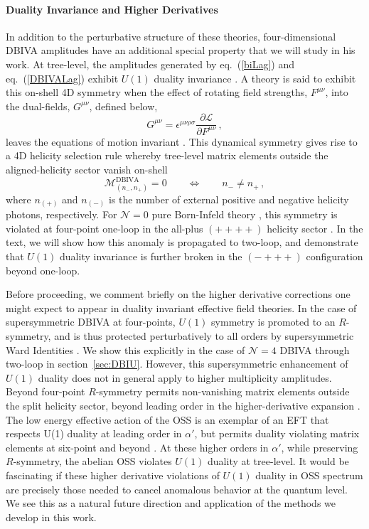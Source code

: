 \documentclass[11pt,letter]{article}
\def\sect#1{section~\ref{#1}}
\def\eqn#1{eq.~(\ref{#1})}
\begin{document}
\paragraph{Duality Invariance and Higher Derivatives}
In addition to the perturbative structure of these theories, four-dimensional DBIVA amplitudes have an additional special property that we will study in his work. At tree-level, the amplitudes generated by \eqn{biLag} and \eqn{DBIVALag} exhibit $U(1)$ {duality invariance} \cite{Bossard:2012xs,Novotny:2018iph}. A theory is said to exhibit this on-shell 4D symmetry when the effect of rotating field strengths, $F^{\mu\nu}$, into the dual-fields, $G^{\mu\nu}$, defined below,
\begin{equation}
G^{\mu\nu} = \epsilon^{\mu\nu\rho\sigma}\frac{\partial \mathcal{L}}{\partial F^{\mu\nu}}\,,
\end{equation}
leaves the equations of motion invariant \cite{Gibbons:1995ap,Babaei-Aghbolagh:2013hia}. This dynamical symmetry gives rise to a 4D helicity selection rule \cite{Novotny:2018iph} whereby tree-level matrix elements outside the aligned-helicity sector vanish on-shell
\begin{equation}
\mathcal{M}^{\text{DBIVA}}_{(n_{-}, n_{+})} =0 \qquad \Leftrightarrow \qquad n_{-}\neq n_{+}\,,
\end{equation}
where $n_{(+)}$ and $n_{(-)}$ is the number of external positive and negative helicity photons, respectively. For $\mathcal{N}=0$ pure Born-Infeld theory \cite{Born:1934gh,Schrodinger:1935oqa}, this symmetry is violated at four-point one-loop in the all-plus $(++++)$ helicity sector \cite{Elvang:2019twd}. In the text, we will show how this anomaly is propagated to two-loop, and demonstrate that $U(1)$ duality invariance is further broken in the $(-+++)$ configuration beyond one-loop. 

Before proceeding, we comment briefly on the higher derivative corrections one might expect to appear in duality invariant effective field theories. In the case of supersymmetric DBIVA at four-points, $U(1)$ symmetry is promoted to an $R$-symmetry, and is thus protected perturbatively to all orders by supersymmetric Ward Identities \cite{Heydeman:2017yww}. We show this explicitly in the case of $\mathcal{N}=4$ DBIVA through two-loop in \sect{sec:DBIU}. However, this supersymmetric enhancement of $U(1)$ duality does not in general apply to higher multiplicity amplitudes. Beyond four-point $R$-symmetry permits non-vanishing matrix elements outside the split helicity sector, beyond leading order in the higher-derivative expansion \cite{Pavao:2022kog}. The low energy effective action of the OSS is an exemplar of an EFT that respects U(1) duality at leading order in $\alpha'$, but permits duality violating matrix elements at six-point and beyond \cite{Carrasco:2016ldy}. At these higher orders in $\alpha'$, while preserving $R$-symmetry, the abelian OSS violates $U(1)$ duality at tree-level. It would be fascinating if these higher derivative violations of $U(1)$ duality in OSS spectrum are precisely those needed to cancel anomalous behavior at the quantum level. We see this as a natural future direction and application of the methods we develop in this work. 
\end{document}
